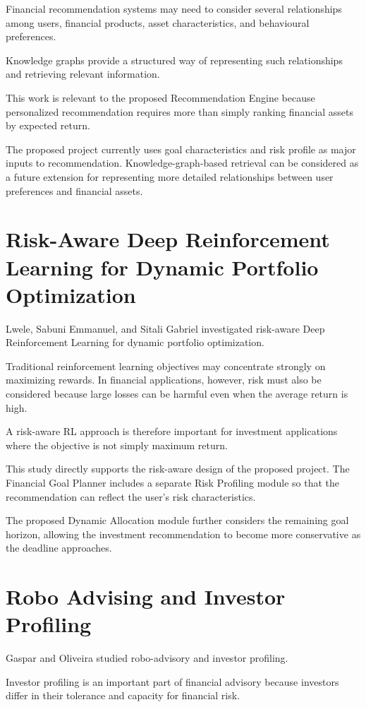Financial recommendation systems may need to consider several relationships among users, financial products, asset characteristics, and behavioural preferences.

Knowledge graphs provide a structured way of representing such relationships and retrieving relevant information.

This work is relevant to the proposed Recommendation Engine because personalized recommendation requires more than simply ranking financial assets by expected return.

The proposed project currently uses goal characteristics and risk profile as major inputs to recommendation. Knowledge-graph-based retrieval can be considered as a future extension for representing more detailed relationships between user preferences and financial assets.

\section{Risk-Aware Deep Reinforcement Learning for Dynamic Portfolio Optimization}
Lwele, Sabuni Emmanuel, and Sitali Gabriel investigated risk-aware Deep Reinforcement Learning for dynamic portfolio optimization.

Traditional reinforcement learning objectives may concentrate strongly on maximizing rewards. In financial applications, however, risk must also be considered because large losses can be harmful even when the average return is high.

A risk-aware RL approach is therefore important for investment applications where the objective is not simply maximum return.

This study directly supports the risk-aware design of the proposed project. The Financial Goal Planner includes a separate Risk Profiling module so that the recommendation can reflect the user's risk characteristics.

The proposed Dynamic Allocation module further considers the remaining goal horizon, allowing the investment recommendation to become more conservative as the deadline approaches.

\section{Robo Advising and Investor Profiling}
Gaspar and Oliveira studied robo-advisory and investor profiling.

Investor profiling is an important part of financial advisory because investors differ in their tolerance and capacity for financial risk.

